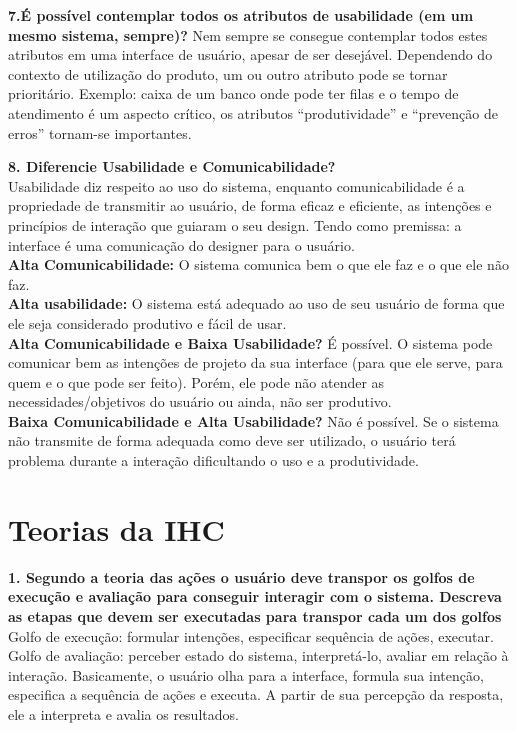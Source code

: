 \documentclass[9pt, twocolumn, article]{memoir}
\begin{document}
\textbf{7.É possível contemplar todos os atributos de usabilidade (em um mesmo sistema, sempre)?}
Nem sempre se consegue contemplar todos estes atributos em uma interface de usuário, apesar de ser desejável. Dependendo do contexto de utilização do produto, um ou outro atributo pode se tornar prioritário. Exemplo: caixa de um banco onde pode ter filas
e o tempo de atendimento é um aspecto crítico, os atributos “produtividade” e “prevenção de erros” tornam-se importantes.

\textbf{8. Diferencie Usabilidade e Comunicabilidade?}\\
Usabilidade diz respeito ao uso do sistema, enquanto comunicabilidade é a propriedade de transmitir ao usuário, de forma eficaz e eficiente, as intenções e princípios de interação que
guiaram o seu design. Tendo como premissa: a interface é uma comunicação do designer para o usuário. \\
\textbf{Alta Comunicabilidade: } O sistema comunica bem o que ele faz e o que ele não faz.\\ 
\textbf{Alta usabilidade: } O sistema está adequado ao uso de seu usuário de forma que ele seja considerado produtivo e fácil de usar.\\

\textbf{Alta Comunicabilidade e Baixa Usabilidade?} É possível. O sistema pode comunicar bem as intenções de projeto da sua interface (para que ele serve, para quem e o que pode ser feito). Porém, ele
pode não atender as necessidades/objetivos do usuário ou ainda, não ser produtivo.\\
\textbf{Baixa Comunicabilidade e Alta Usabilidade?} Não é possível. Se o sistema não transmite de forma adequada como deve ser utilizado, o usuário terá problema durante a interação dificultando o uso e a produtividade.

\section*{Teorias da IHC}

\textbf{1. Segundo  a  teoria  das  ações  o  usuário  deve  transpor  os  golfos  de  execução  e  avaliação  para conseguir interagir com o sistema. Descreva as etapas que devem ser executadas para transpor cada um dos golfos}\\
Golfo de execução: formular intenções, especificar sequência de ações, executar. Golfo de avaliação: perceber estado do sistema, interpretá-lo, avaliar em relação à interação. Basicamente, o usuário olha para a interface, formula sua intenção, especifica a sequência de ações e executa. A partir de sua percepção da resposta, ele a interpreta e avalia os resultados.
\end{document}
